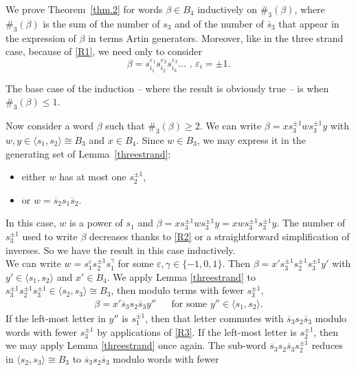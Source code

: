 \documentclass[12pt,reqno]{amsart}
\theoremstyle{definition}
\def\la{\langle}
\def\ra{\rangle}
\def\b{\beta}
\def\g{\gamma}
\def\ve{\varepsilon}
\def\be{\begin{equation}}
\def\ee{\end{equation}}
\def\hs{\overline{s}}
\begin{document}
We prove Theorem~\ref{thm.2} for words $\beta \in B_4$ inductively on
$\#_{3}(\beta)$, where $\#_{3}(\beta)$ is the sum of the number of $s_{3}$ and of
the number of $\hs_{3}$ that appear in the expression of $\beta$ in terms Artin
generators. Moreover, like in the three strand case, because of \eqref{R1}, we
need only to consider 
\be
\beta = s_{i_1}^{\varepsilon_1} s_{i_2}^{\varepsilon_2} s_{i_3}^{\varepsilon_3}
\ldots  \text{ , } \varepsilon_i = \pm 1.
\ee

The base case of the induction -- where the result is obviously true -- is when
$\#_{3}(\beta) \leq 1$.

Now consider a word $\b$ such that $\#_{3}(\beta) \geq 2$. We can write
$\beta = x s_{3}^{\pm 1} w s_{3}^{\pm 1} y$ with $w,y \in \la s_1, s_2\ra \cong B_3$
and $x\in B_4$. Since $w\in B_3$, we may express it in the generating set of
Lemma~\ref{threestrand}:
\begin{itemize}
\item
  either $w$ has at most one $s_2^{\pm 1}$,
\item
  or $w = \hs_2 s_1 \hs_2$.
\end{itemize}
 In this case, $w$ is a power of $s_1$ and
$\b=xs_{3}^{\pm 1}ws_{3}^{\pm 1}y=xws_{3}^{\pm 1}s_{3}^{\pm 1}y$. The number of
$s_{3}^{\pm 1}$ used to write $\beta$ decreases thanks to \eqref{R2} or a
straightforward simplification of inverses. So we have the result in this case
inductively.
\\
 We can write $w=s_1^\ve s_2^{\pm1} s_1^\g$ for
some $\varepsilon,\g\in\{-1,0,1\}$. Then $\beta = x' s_{3}^{\pm 1} s_{2}^{\pm 1}
s_{3}^{\pm 1} y'$ with $y' \in \la s_1, s_2\ra$ and $x'\in B_4$. We apply Lemma
\ref{threestrand} to $s_{3}^{\pm 1} s_{2}^{\pm 1} s_{3}^{\pm 1}\in \la s_2, s_3\ra
\cong B_3$, then modulo terms with fewer $s_{3}^{\pm 1}$,
\be
\label{eq.case2x'y''}
\begin{aligned}
    \beta = x' \hs_3 s_2 \hs_3 y'' && \mbox{for some $y'' \in \la s_1, s_2\ra$.}
\end{aligned}
\ee
If the left-most letter in $y''$ is $s_{1}^{\pm 1}$, then that letter commutes
with $\hs_3 s_2 \hs_3$ modulo words with fewer $s_{3}^{\pm 1}$ by applications of
\eqref{R3}. If the left-most letter is $s_{2}^{\pm 1}$, then we may apply Lemma
\ref{threestrand} once again. The sub-word $\hs_3 s_2 \hs_3 s_{2}^{\pm 1}$ reduces
in $\la s_2, s_3\ra \cong B_3$ to $\hs_3 s_2 \hs_3$ modulo words with fewer
\end{document}
